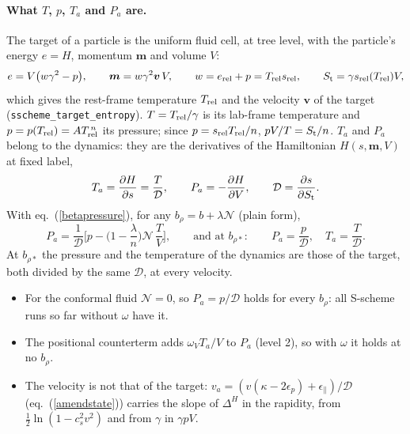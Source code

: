 \documentclass[11pt,aps,preprint,nofootinbib,superscriptaddress,tightenlines]{revtex4-2}
\def\st{\begin{equation}}
\def\stp{\end{equation}}
\def\Eq#1{eq.~(\ref{#1})}
\let\oldparagraph\paragraph
\renewcommand{\paragraph}{\par\bigskip\oldparagraph}
\begin{document}
\paragraph{What $T$, $p$, $T_a$ and $P_a$ are.}  The target of a particle is the uniform fluid cell, at tree level, with the particle's energy
$e=H$, momentum $\bm m$ and volume $V$:
\st
e=V\big(w\gamma^2-p\big),\qquad \bm m=w\gamma^2\bm v\,V,\qquad w=e_{\rm rel}+p=T_{\rm rel}s_{\rm rel},\qquad S_{\rm t}=\gamma s_{\rm rel}(T_{\rm rel})V ,
\stp
which gives the rest-frame temperature $T_{\rm rel}$ and the velocity $\bm v$ of the target (\texttt{sscheme\_target\_entropy}).  $T=T_{\rm rel}/\gamma$
is its lab-frame temperature and $p=p(T_{\rm rel})=AT_{\rm rel}^{\,n}$ its pressure; since $p=s_{\rm rel}T_{\rm rel}/n$, $pV/T=S_{\rm t}/n$.  $T_a$
and $P_a$ belong to the dynamics: they are the derivatives of the Hamiltonian $H(s,\bm m,V)$ at fixed label,
\st
T_a=\frac{\partial H}{\partial s}=\frac T{\mathcal D},\qquad P_a=-\frac{\partial H}{\partial V},\qquad \mathcal D=\frac{\partial s}{\partial S_{\rm t}} .
\stp
With \Eq{betapressure}, for any $b_\rho=b+\lambda\mathcal N$ (plain form),
\st
P_a=\frac1{\mathcal D}\Big[p-\Big(1-\frac\lambda n\Big)\mathcal N\,\frac TV\Big],
\qquad\text{and at }b_{\rho*}:\qquad P_a=\frac p{\mathcal D},\quad T_a=\frac T{\mathcal D} .
\label{pastar}
\stp
At $b_{\rho*}$ the pressure and the temperature of the dynamics are those of the target, both divided by the same $\mathcal D$, at every velocity.
\begin{itemize}
\item For the conformal fluid $\mathcal N=0$, so $P_a=p/\mathcal D$ holds for every $b_\rho$: all S-scheme runs so far without $\omega$ have it.
\item The positional counterterm adds $\omega_V T_a/V$ to $P_a$ (level 2), so with $\omega$ it holds at no $b_\rho$.
\item The velocity is not that of the target: $v_a=(v(\kappa-2\epsilon_p)+\epsilon_\parallel)/\mathcal D$ (\Eq{amendstate}) carries the slope of
  $\Delta^H$ in the rapidity, from $\tfrac12\ln(1-c_s^2v^2)$ and from $\gamma$ in $\gamma pV$.
\end{itemize}
\end{document}
